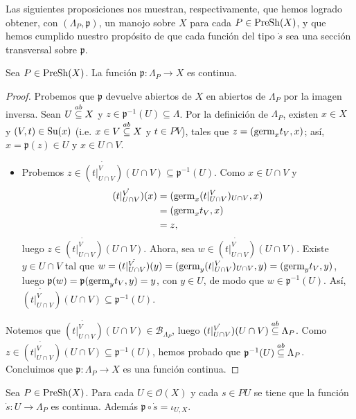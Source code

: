 Las siguientes proposiciones nos muestran, respectivamente, que hemos logrado obtener, con $(\Lambda_{P},\mathfrak{p})$, un manojo sobre $X$ para cada $P\in\normalfont{\text{PreSh}}(X)$, y que hemos cumplido nuestro propósito de que cada función del tipo $\dot{s}$ sea una sección transversal sobre $\mathfrak{p}$.
\begin{Prop}
   Sea $P\in\normalfont{\text{PreSh}}(X)$. La función $\mathfrak{p}:\Lambda_P\to X$ es continua. 
\end{Prop}
\begin{proof}
   Probemos que $\mathfrak{p}$ devuelve abiertos de $X$ en abiertos de $\Lambda_P$ por la imagen inversa. Sean $U\stackrel{ab}{\subseteq} X$ y $z\in\mathfrak{p}^{-1}(U)\subseteq \Lambda$. Por la definición de $\Lambda_P$, existen $x\in X$ y $(V,t)\in\normalfont{\text{Su}}(x)$ (i.e. $x\in V\stackrel{ab}{\subseteq} X$ y $t\in PV$), tales que $z=(\normalfont{\text{germ}}_{x}t_{V},x)$; así, $x=\mathfrak{p}(z)\in U$ y $x\in U\cap V$.
   \begin{itemize}
      \item Probemos $z\in\dot{(t|^{V}_{U\cap V})}(U\cap V)\subseteq\mathfrak{p}^{-1}(U)$. Como $x\in U\cap V$ y
         $$
         \begin{aligned}
            \dot{(t|^{V}_{U\cap V})}(x)&=(\normalfont{\text{germ}}_{x}(t|^{V}_{U\cap V})_{U\cap V},x)\\
                                       &=(\normalfont{\text{germ}}_{x}t_{V},x)\\
                                       &=z,
         \end{aligned}
         $$
         luego $z\in\dot{(t|^{V}_{U\cap V})}(U\cap V)$. Ahora, sea $w\in\dot{(t|^{V}_{U\cap V})}(U\cap V)$. Existe $y\in U\cap V$ tal que $w=\dot{(t|^{V}_{U\cap V})}(y)=(\normalfont{\text{germ}}_{y}(t|^{V}_{U\cap V})_{U\cap V},y)=(\normalfont{\text{germ}}_{y}t_{V},y)$, luego $\mathfrak{p}(w)=\mathfrak{p}(\normalfont{\text{germ}}_{y}t_{V},y)=y$, con $y\in U$, de modo que $w\in\mathfrak{p}^{-1}(U)$. Así, $\dot{(t|^{V}_{U\cap V})}(U\cap V)\subseteq \mathfrak{p}^{-1}(U)$.
   \end{itemize}
   Notemos que $\dot{(t|^{V}_{U\cap V})}(U\cap V)\in\mathcal{B}_{\Lambda_P}$, luego $\dot{(t|^{V}_{U\cap V})}(U\cap V)\stackrel{ab}{\subseteq} \Lambda_P$. Como $z\in\dot{(t|^{V}_{U\cap V})}(U\cap V)\subseteq \mathfrak{p}^{-1}(U)$, hemos probado que $\mathfrak{p}^{-1}(U)\stackrel{ab}{\subseteq} \Lambda_P$. Concluimos que $\mathfrak{p}:\Lambda_P\to X$ es una función continua. 
\end{proof}
\begin{Prop}
   Sea $P\in \normalfont{\text{PreSh}}(X)$. Para cada $U\in\mathcal{O}(X)$ y cada $s\in PU$ se tiene que la función $\dot{s}:U\to \Lambda_P$ es continua. Además $\mathfrak{p}\circ\dot{s}=\iota_{U,X}$.
\end{Prop}
